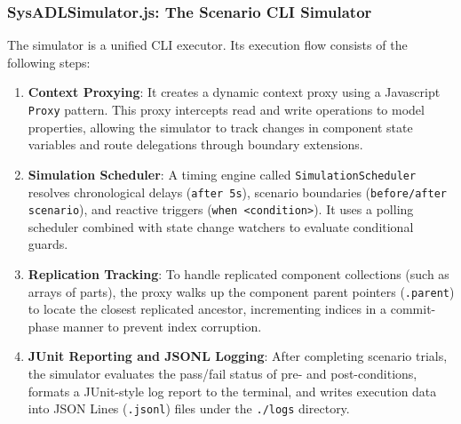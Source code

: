 \subsubsection{SysADLSimulator.js: The Scenario CLI Simulator}
The simulator is a unified CLI executor. Its execution flow consists of the following steps:
\begin{enumerate}
    \item \textbf{Context Proxying}: It creates a dynamic context proxy using a Javascript \texttt{Proxy} pattern. This proxy intercepts read and write operations to model properties, allowing the simulator to track changes in component state variables and route delegations through boundary extensions.
    \item \textbf{Simulation Scheduler}: A timing engine called \texttt{SimulationScheduler} resolves chronological delays (\texttt{after 5s}), scenario boundaries (\texttt{before/after scenario}), and reactive triggers (\texttt{when <condition>}). It uses a polling scheduler combined with state change watchers to evaluate conditional guards.
    \item \textbf{Replication Tracking}: To handle replicated component collections (such as arrays of parts), the proxy walks up the component parent pointers (\texttt{.parent}) to locate the closest replicated ancestor, incrementing indices in a commit-phase manner to prevent index corruption.
    \item \textbf{JUnit Reporting and JSONL Logging}: After completing scenario trials, the simulator evaluates the pass/fail status of pre- and post-conditions, formats a JUnit-style log report to the terminal, and writes execution data into JSON Lines (\texttt{.jsonl}) files under the \texttt{./logs} directory.
\end{enumerate}

